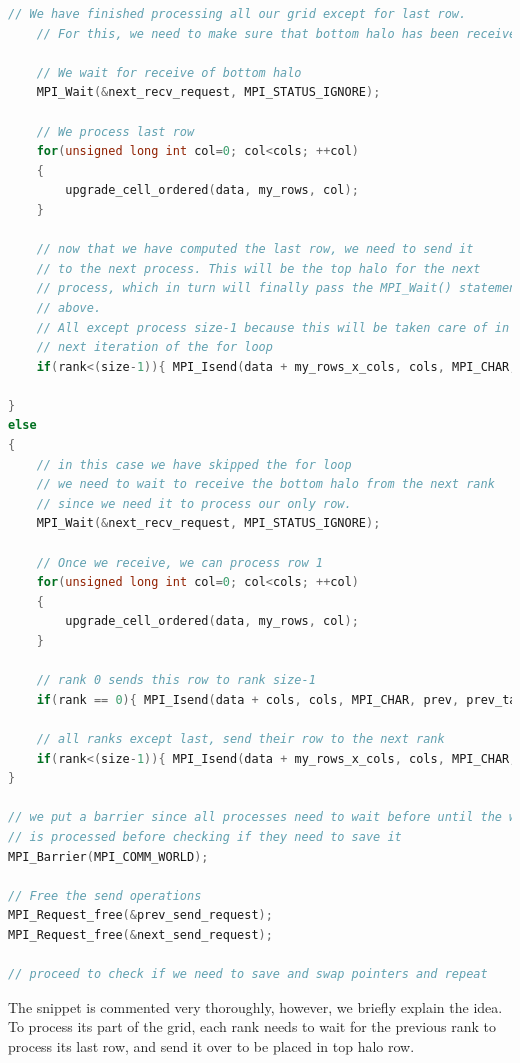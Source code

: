 \documentclass{report}
\begin{document}
\begin{lstlisting}[language=C++]
    // We have finished processing all our grid except for last row. 
    // For this, we need to make sure that bottom halo has been received.

    // We wait for receive of bottom halo
    MPI_Wait(&next_recv_request, MPI_STATUS_IGNORE);

    // We process last row
    for(unsigned long int col=0; col<cols; ++col)
    {
        upgrade_cell_ordered(data, my_rows, col);
    }

    // now that we have computed the last row, we need to send it 
    // to the next process. This will be the top halo for the next 
    // process, which in turn will finally pass the MPI_Wait() statement 
    // above.
    // All except process size-1 because this will be taken care of in the 
    // next iteration of the for loop
    if(rank<(size-1)){ MPI_Isend(data + my_rows_x_cols, cols, MPI_CHAR, next, next_tag, MPI_COMM_WORLD, &next_send_request);}

}
else
{
    // in this case we have skipped the for loop
    // we need to wait to receive the bottom halo from the next rank 
    // since we need it to process our only row.
    MPI_Wait(&next_recv_request, MPI_STATUS_IGNORE);
    
    // Once we receive, we can process row 1
    for(unsigned long int col=0; col<cols; ++col)
    {
        upgrade_cell_ordered(data, my_rows, col);
    }

    // rank 0 sends this row to rank size-1
    if(rank == 0){ MPI_Isend(data + cols, cols, MPI_CHAR, prev, prev_tag, MPI_COMM_WORLD, &prev_send_request);}

    // all ranks except last, send their row to the next rank
    if(rank<(size-1)){ MPI_Isend(data + my_rows_x_cols, cols, MPI_CHAR, next, next_tag, MPI_COMM_WORLD, &next_send_request);}
}

// we put a barrier since all processes need to wait before until the whole grid 
// is processed before checking if they need to save it
MPI_Barrier(MPI_COMM_WORLD);

// Free the send operations
MPI_Request_free(&prev_send_request);
MPI_Request_free(&next_send_request);

// proceed to check if we need to save and swap pointers and repeat

\end{lstlisting}

The snippet is commented very thoroughly, however, we briefly explain the idea. 
To process its part of the grid, each rank needs to wait for the previous rank 
to process its last row, and send it over to be placed in top halo row. 
\end{document}
